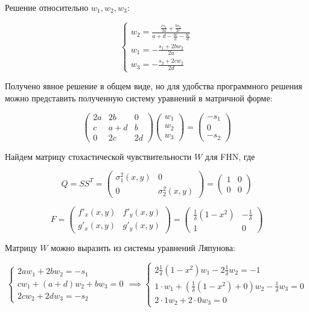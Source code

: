 Решение относительно $w_1, w_2, w_3$:

$$
\begin{cases}
    w_2 = \frac{
        \frac{c s_1}{2a} + \frac{b s_2}{2c}
    }{
        a + d - \frac{b c}{a} - \frac{b c}{d}
    } \\
    w_1 = -\frac{s_1 + 2b w_2}{2a} \\
    w_3 = -\frac{s_2 + 2c w_2}{2d}
\end{cases}
$$

Получено явное решение в общем виде, но для удобства программного решения можно представить полученную систему уравнений в матричной форме:

$$
\begin{pmatrix}
    2a & 2b & 0 \\
    c & a+d & b \\
    0 & 2c & 2d
\end{pmatrix}
\begin{pmatrix}
    w_1 \\ w_2 \\ w_3
\end{pmatrix}
=
\begin{pmatrix}
    -s_1 \\ 0 \\ -s_2
\end{pmatrix}
$$

Найдем матрицу стохастической чувствительности $W$ для FHN, где

$$
Q = SS^T = 
\begin{pmatrix}
    \sigma_1^2(x, y) & 0 \\
    0 & \sigma_2^2(x, y)
\end{pmatrix}
=
\begin{pmatrix}
    1 & 0 \\
    0 & 0
\end{pmatrix}
$$

$$
F = 
\begin{pmatrix}
    f'_x(x, y) & f'_y(x, y) \\
    g'_x(x, y) & g'_y(x, y)
\end{pmatrix}
=
\begin{pmatrix}
    \frac{1}{\delta} (1 - x^2) & -\frac{1}{\delta} \\
    1 & 0
\end{pmatrix}
$$

Матрицу $W$ можно выразить из системы уравнений Ляпунова:

$$
\begin{cases}
    2a w_1 + 2b w_2 = -s_1 \\
    c w_1 + (a+d) w_2 + b w_3 = 0 \\
    2c w_2 + 2d w_3 = -s_2
\end{cases}
\implies
\begin{cases}
    2\frac{1}{\delta} (1 - x^2) w_1 - 2 \frac{1}{\delta} w_2 = -1 \\
    1 \cdot w_1 + (\frac{1}{\delta} (1 - x^2) + 0) w_2 - \frac{1}{\delta} w_3 = 0 \\
    2 \cdot 1 w_2 + 2 \cdot 0 w_3 = 0
\end{cases}
$$

